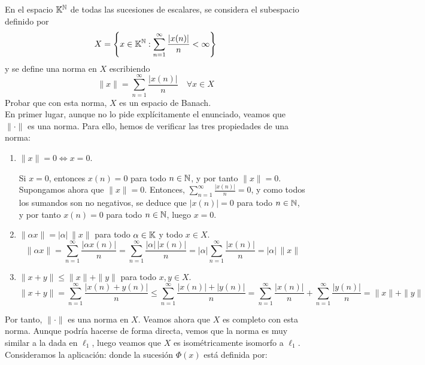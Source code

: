 \begin{ejercicio}
En el espacio $\mathbb{K}^{\mathbb{N}}$ de todas las sucesiones de escalares, se considera el subespacio definido por
\[
X = \left\{ x \in \mathbb{K}^{\mathbb{N}} : \sum_{n=1}^\infty \frac{|x(n)|}{n} < \infty \right\}
\]
y se define una norma en $X$ escribiendo
\[
\|x\| = \sum_{n=1}^\infty \frac{|x(n)|}{n} \quad \forall x \in X
\]
Probar que con esta norma, $X$ es un espacio de Banach.\\

En primer lugar, aunque no lo pide explícitamente el enunciado, veamos que $\|\cdot\|$ es una norma. Para ello, hemos de verificar las tres propiedades de una norma:
\begin{enumerate}
    \item $\|x\| = 0 \iff x = 0$.
    
    Si $x = 0$, entonces $x(n) = 0$ para todo $n \in \mathbb{N}$, y por tanto $\|x\| = 0$. Supongamos ahora que $\|x\| = 0$. Entonces, $\sum\limits_{n=1}^\infty \frac{|x(n)|}{n} = 0$, y como todos los sumandos son no negativos, se deduce que $|x(n)| = 0$ para todo $n \in \mathbb{N}$, y por tanto $x(n) = 0$ para todo $n \in \mathbb{N}$, luego $x = 0$.

    \item $\|\alpha x\| = |\alpha| \, \|x\|$ para todo $\alpha \in \mathbb{K}$ y todo $x \in X$.
    \begin{equation*}
        \|\alpha x\| = \sum_{n=1}^\infty \frac{|\alpha x(n)|}{n} = \sum_{n=1}^\infty \frac{|\alpha| \, |x(n)|}{n} = |\alpha| \sum_{n=1}^\infty \frac{|x(n)|}{n} = |\alpha| \, \|x\|
    \end{equation*}

    \item $\|x + y\| \leq \|x\| + \|y\|$ para todo $x, y \in X$.
    \begin{equation*}
        \|x + y\| = \sum_{n=1}^\infty \frac{|x(n) + y(n)|}{n} \leq \sum_{n=1}^\infty \frac{|x(n)| + |y(n)|}{n} = \sum_{n=1}^\infty \frac{|x(n)|}{n} + \sum_{n=1}^\infty \frac{|y(n)|}{n} = \|x\| + \|y\|
    \end{equation*}
\end{enumerate}

Por tanto, $\|\cdot\|$ es una norma en $X$. Veamos ahora que $X$ es completo con esta norma. Aunque podría hacerse de forma directa, vemos que la norma es muy similar a la dada en $\ell_1$, luego veamos que $X$ es isométricamente isomorfo a $\ell_1$. Consideramos la aplicación:
donde la sucesión $\Phi(x)$ está definida por:


\end{ejercicio}
